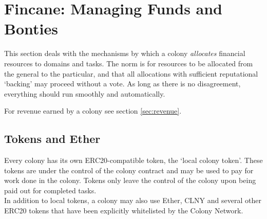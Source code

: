 

\section{Fincane: Managing Funds and Bonties}\label{sec:finance}
This section deals with the mechanisms by which a colony \emph{allocates} financial resources to domains and tasks. The norm is for resources to be allocated from the general to the particular, and that all allocations with sufficient reputational `backing' may proceed without a vote. As long as there is no disagreement, everything should run smoothly and automatically.

For revenue earned by a colony see section \ref{sec:revenue}.

\subsection{Tokens and Ether}
Every colony has its own ERC20-compatible token, the `local colony token'. These tokens are under the control of the colony contract and may be used to pay for work done in the colony. Tokens only leave the control of the colony upon being paid out for completed tasks.\\
In addition to local tokens, a colony may also use Ether, CLNY and several other ERC20 tokens that have been explicitly whitelisted by the Colony Network.



